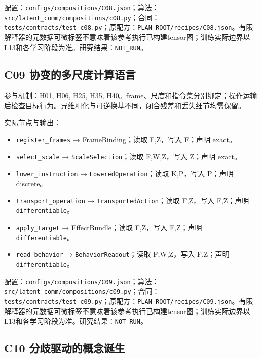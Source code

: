 \documentclass[
  10pt,
]{article}
\begin{document}
配置：{\small\nolinkurl{configs/compositions/C08.json}}；算法：{\small\nolinkurl{src/latent_comm/compositions/c08.py}}；合同：{\small\nolinkurl{tests/contracts/test_c08.py}}；原配方：{\small\nolinkurl{PLAN_ROOT/recipes/C08.json}}。有限解释器的元数据可微标签不意味着该参考执行已构建tensor图；训练实际边界以L13和各学习阶段为准。研究结果：\nolinkurl{NOT_RUN}。

\subsection{C09
协变的多尺度计算语言}\label{c09-ux534fux53d8ux7684ux591aux5c3aux5ea6ux8ba1ux7b97ux8bedux8a00}

参与机制：H01, H06, H25, H35,
H40。frame、尺度和指令集分别绑定；操作运输后检查目标行为。异维粗化与可逆换基不同，闭合残差和丢失细节均需保留。

实际节点与输出：

\begin{itemize}
\item
  \nolinkurl{register_frames} → FrameBinding；读取 F,Z，写入 F；声明
  exact。
\item
  \nolinkurl{select_scale} → \nolinkurl{ScaleSelection}；读取
  F,W,Z，写入 Z；声明 exact。
\item
  \nolinkurl{lower_instruction} → \nolinkurl{LoweredOperation}；读取
  K,P，写入 P；声明 discrete。
\item
  \nolinkurl{transport_operation} → \nolinkurl{TransportedAction}；读取
  F,Z，写入 F,Z；声明 \nolinkurl{differentiable}。
\item
  \nolinkurl{apply_target} → EffectBundle；读取 F,Z，写入 F,Z；声明
  \nolinkurl{differentiable}。
\item
  \nolinkurl{read_behavior} → \nolinkurl{BehaviorReadout}；读取
  F,W,Z，写入 F,Z；声明 \nolinkurl{differentiable}。
\end{itemize}

配置：{\small\nolinkurl{configs/compositions/C09.json}}；算法：{\small\nolinkurl{src/latent_comm/compositions/c09.py}}；合同：{\small\nolinkurl{tests/contracts/test_c09.py}}；原配方：{\small\nolinkurl{PLAN_ROOT/recipes/C09.json}}。有限解释器的元数据可微标签不意味着该参考执行已构建tensor图；训练实际边界以L13和各学习阶段为准。研究结果：\nolinkurl{NOT_RUN}。

\subsection{C10
分歧驱动的概念诞生}\label{c10-ux5206ux6b67ux9a71ux52a8ux7684ux6982ux5ff5ux8bdeux751f}
\end{document}
